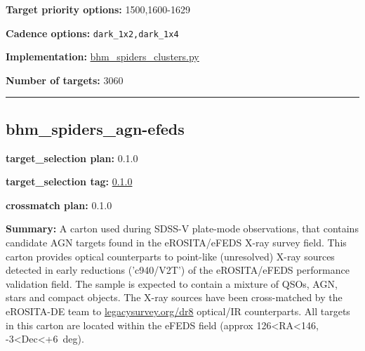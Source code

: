 \noindent\textbf{Target priority options:} 1500,1600-1629

\noindent\textbf{Cadence options:} \texttt{dark\_1x2,dark\_1x4}

\noindent\textbf{Implementation:}
\href{https://github.com/sdss/target_selection/blob/0.3.0/python/target_selection/cartons/bhm_spiders_clusters.py}{bhm\_spiders\_clusters.py}

\noindent\textbf{Number of targets:} 3060

\begin{center}\rule{0.5\linewidth}{0.5pt}\end{center}

\hypertarget{bhm_spiders_agn-efeds_plan0.1.0}{%
\subsection{bhm\_spiders\_agn-efeds}\label{bhm_spiders_agn-efeds_plan0.1.0}}

\noindent\textbf{target\_selection plan:} 0.1.0

\noindent\textbf{target\_selection tag:}
\href{https://github.com/sdss/target_selection/tree/0.1.0/}{0.1.0}

\noindent\textbf{crossmatch plan:} 0.1.0

\noindent\textbf{Summary:} A carton used during SDSS-V plate-mode observations,
that contains candidate AGN targets found in the eROSITA/eFEDS X-ray
survey field. This carton provides optical counterparts to point-like
(unresolved) X-ray sources detected in early reductions ('c940/V2T') of
the eROSITA/eFEDS performance validation field. The sample is expected
to contain a mixture of QSOs, AGN, stars and compact objects. The X-ray
sources have been cross-matched by the eROSITA-DE team to
\href{https://www.legacysurvey.org/dr8/}{legacysurvey.org/dr8}
optical/IR counterparts. All targets in this carton are located within
the eFEDS field (approx 126\textless RA\textless146,
-3\textless Dec\textless+6~deg).

